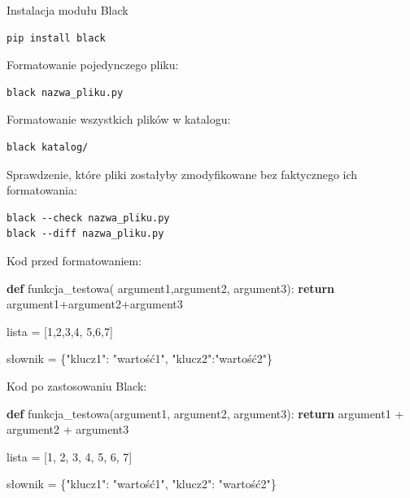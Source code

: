 \documentclass[
  polish,
  letterpaper,
  DIV=11,
  numbers=noendperiod]{scrreprt}
\newenvironment{Shaded}{\begin{snugshade}}{\end{snugshade}}
\newcommand{\ControlFlowTok}[1]{\textcolor[rgb]{0.00,0.23,0.31}{\textbf{#1}}}
\newcommand{\DecValTok}[1]{\textcolor[rgb]{0.68,0.00,0.00}{#1}}
\newcommand{\KeywordTok}[1]{\textcolor[rgb]{0.00,0.23,0.31}{\textbf{#1}}}
\newcommand{\NormalTok}[1]{\textcolor[rgb]{0.00,0.23,0.31}{#1}}
\newcommand{\OperatorTok}[1]{\textcolor[rgb]{0.37,0.37,0.37}{#1}}
\newcommand{\StringTok}[1]{\textcolor[rgb]{0.13,0.47,0.30}{#1}}
\begin{document}
Instalacja modułu Black

\begin{verbatim}
pip install black
\end{verbatim}

Formatowanie pojedynczego pliku:

\begin{verbatim}
black nazwa_pliku.py
\end{verbatim}

Formatowanie wszystkich plików w katalogu:

\begin{verbatim}
black katalog/
\end{verbatim}

Sprawdzenie, które pliki zostałyby zmodyfikowane bez faktycznego ich
formatowania:

\begin{verbatim}
black --check nazwa_pliku.py
black --diff nazwa_pliku.py
\end{verbatim}

Kod przed formatowaniem:

\begin{Shaded}
\begin{Highlighting}[]
\KeywordTok{def}\NormalTok{ funkcja\_testowa( argument1,argument2,    argument3):}
    \ControlFlowTok{return}\NormalTok{      argument1}\OperatorTok{+}\NormalTok{argument2}\OperatorTok{+}\NormalTok{argument3}

\NormalTok{lista }\OperatorTok{=}\NormalTok{ [}\DecValTok{1}\NormalTok{,}\DecValTok{2}\NormalTok{,}\DecValTok{3}\NormalTok{,}\DecValTok{4}\NormalTok{,}
\DecValTok{5}\NormalTok{,}\DecValTok{6}\NormalTok{,}\DecValTok{7}\NormalTok{]}

\NormalTok{słownik }\OperatorTok{=}\NormalTok{ \{}\StringTok{"klucz1"}\NormalTok{:    }\StringTok{"wartość1"}\NormalTok{,}
\StringTok{"klucz2"}\NormalTok{:}\StringTok{"wartość2"}\NormalTok{\}}
\end{Highlighting}
\end{Shaded}

Kod po zastosowaniu Black:

\begin{Shaded}
\begin{Highlighting}[]
\KeywordTok{def}\NormalTok{ funkcja\_testowa(argument1, argument2, argument3):}
    \ControlFlowTok{return}\NormalTok{ argument1 }\OperatorTok{+}\NormalTok{ argument2 }\OperatorTok{+}\NormalTok{ argument3}


\NormalTok{lista }\OperatorTok{=}\NormalTok{ [}\DecValTok{1}\NormalTok{, }\DecValTok{2}\NormalTok{, }\DecValTok{3}\NormalTok{, }\DecValTok{4}\NormalTok{, }\DecValTok{5}\NormalTok{, }\DecValTok{6}\NormalTok{, }\DecValTok{7}\NormalTok{]}

\NormalTok{słownik }\OperatorTok{=}\NormalTok{ \{}\StringTok{"klucz1"}\NormalTok{: }\StringTok{"wartość1"}\NormalTok{, }\StringTok{"klucz2"}\NormalTok{: }\StringTok{"wartość2"}\NormalTok{\}}
\end{Highlighting}
\end{Shaded}
\end{document}
